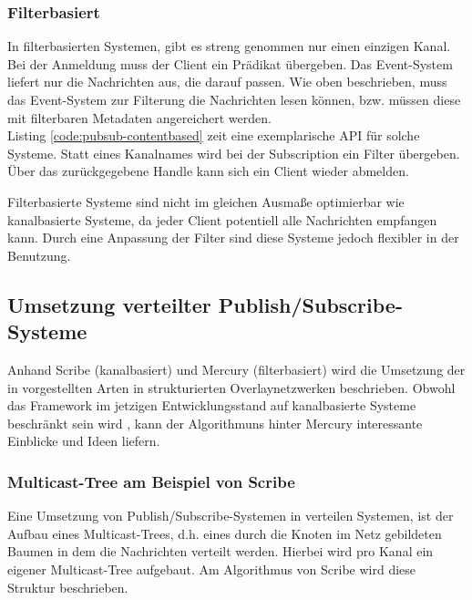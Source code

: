\subsubsection{Filterbasiert}
\label{chap:grundlagen:pubsub:filterbased}
In filterbasierten Systemen, gibt es streng genommen nur einen einzigen Kanal. Bei der Anmeldung muss der Client ein Prädikat übergeben. Das Event-System liefert nur die Nachrichten aus, die darauf passen. Wie oben beschrieben, muss das Event-System zur Filterung die Nachrichten lesen können, bzw. müssen diese mit filterbaren Metadaten angereichert werden.\\
Listing \ref{code:pubsub-contentbased} zeit eine exemplarische API für solche Systeme. Statt eines Kanalnames wird bei der Subscription ein Filter übergeben. Über das zurückgegebene Handle kann sich ein Client wieder abmelden.

Filterbasierte Systeme sind nicht im gleichen Ausmaße optimierbar wie kanalbasierte Systeme, da jeder Client potentiell alle Nachrichten empfangen kann. Durch eine Anpassung der Filter sind diese Systeme jedoch flexibler in der Benutzung.




\subsection{Umsetzung verteilter Publish/Subscribe-Systeme}
Anhand Scribe (kanalbasiert) \cite{Castro2002Scribe} und Mercury (filterbasiert) \cite{Bharambe2004Mercury} wird die Umsetzung der in  vorgestellten Arten in strukturierten Overlaynetzwerken beschrieben. Obwohl das Framework im jetzigen Entwicklungsstand auf kanalbasierte Systeme beschränkt sein wird , kann der Algorithmuns hinter Mercury interessante Einblicke und Ideen liefern.

\subsubsection*{Multicast-Tree am Beispiel von Scribe}
\label{chap:related:scribe}
Eine Umsetzung von Publish/Subscribe-Systemen in verteilen Systemen, ist der Aufbau eines Multicast-Trees, d.h. eines durch die Knoten im Netz gebildeten Baumen in dem die Nachrichten verteilt werden. Hierbei wird pro Kanal ein eigener Multicast-Tree aufgebaut. Am Algorithmus von Scribe wird diese Struktur beschrieben.

